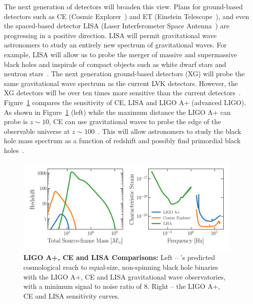 The next generation  of detectors will broaden this view. 
Plans for ground-based detectors such as CE (Cosmic Explorer~\cite{Reitze:2019:BAAS}) and ET (Einstein Telescope~\cite{Maggiore:2020:JCAP}), and even the spaced-based detector LISA (Laser Interferometer Space Antenna~\cite{Amaro-Seoane:2017:arXiv}) are progressing in a positive direction. 
LISA will permit gravitational wave astronomers to study an entirely new spectrum of gravitational waves. 
For example, LISA will allow us to probe the merger of massive and supermassive black holes and inspirals of compact objects such as white dwarf stars and neutron stars~\cite{Amaro-Seoane:2017:arXiv}. 
The next generation ground-based detectors (XG) will probe the same gravitational wave spectrum as the current LVK detectors. 
However, the XG detectors will be over ten times more sensitive than the current detectors~\cite{Reitze:2019:BAAS, Maggiore:2020:JCAP}. 
Figure~\ref{fig:ligo_vs_ce} compares the sensitivity of CE, LISA and LIGO A+ (advanced LIGO). 
As shown in Figure~\ref{fig:ligo_vs_ce} (left) while the maximum distance the LIGO A+ can probe is $z\sim10$, CE can use gravitational waves to probe the edge of the observable universe at $z\sim100$~\cite{Reitze:2019:BAAS}. 
This will allow astronomers to study the black hole mass spectrum as a function of redshift and possibly find primordial black holes~\cite{Reitze:2019:BAAS}.
\begin{figure}
\begin{center}
  \centerline{\includegraphics[width=1.\linewidth]{src/figures/ligo_vs_ce.png}}
  \caption{\textbf{LIGO A+, CE and LISA Comparisons:} Left -- \citet{Jani:2020:NatAs}'s predicted cosmological reach to equal-size, non-spinning black hole binaries with the LIGO A+, CE and LISA gravitational wave observatories, with a minimum signal to noise ratio of 8. Right -- the LIGO A+, CE and LISA sensitivity curves. }
  \label{fig:ligo_vs_ce}
\end{center}
\end{figure}


